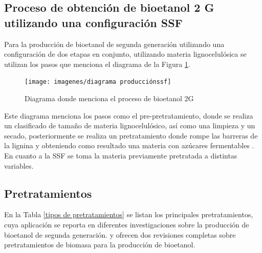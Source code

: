 \documentclass[12pt]{article}
\begin{document}
		\subsection{Proceso de obtención de bioetanol 2 G  utilizando una configuración SSF  }		
		Para la producción de bioetanol de segunda generación utilizando una configuración de dos etapas en conjunto, utilizando materia lignocelulósica se utilizan los pasos que menciona el diagrama de la Figura \ref{fig:diagrama-produccionssf}.
	
		\begin{figure}[H]
			\centering
			\texttt{[image: imagenes/diagrama producciónssf]}
			\caption{Diagrama donde menciona el proceso de bioetanol 2G}
			\label{fig:diagrama-produccionssf}
		\end{figure}
		
		
	Este diagrama menciona los pasos como el pre-pretratamiento, donde se realiza un clasificado de tamaño de materia lignocelulósico, así como una limpieza y un secado, posteriormente se realiza un pretratamiento donde rompe las barreras de la lignina y obteniendo como resultado una materia con azúcares fermentables . En cuanto a la SSF se toma la materia previamente pretratada a distintas variables.
		
		
		
		\subsection{Pretratamientos}
		En la Tabla \ref{tipos de pretratamientos} se listan los principales pretratamientos, cuya aplicación se reporta en diferentes investigaciones sobre la producción de bioetanol de segunda generación. \cite{ADITIYA2016631} y \cite{Nasution_2022}
		ofrecen dos revisiones completas sobre pretratamientos de biomasa para la producción de bioetanol.
		
\end{document}
